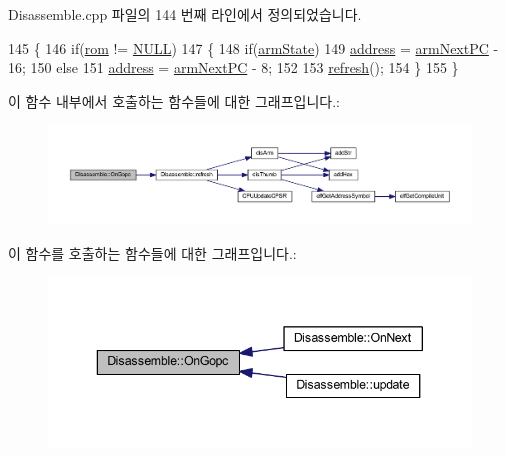 Disassemble.\+cpp 파일의 144 번째 라인에서 정의되었습니다.


\begin{DoxyCode}
145 \{
146   \textcolor{keywordflow}{if}(\mbox{\hyperlink{_globals_8cpp_adafc6ed627110c42f3893c9783f55320}{rom}} != \mbox{\hyperlink{getopt1_8c_a070d2ce7b6bb7e5c05602aa8c308d0c4}{NULL}})
147   \{
148   \textcolor{keywordflow}{if}(\mbox{\hyperlink{_g_b_a_8h_adeb5542a7f7ef80090a22d0133606250}{armState}})
149     \mbox{\hyperlink{class_disassemble_a960ac8317ada7182e59132a3ee4afb48}{address}} = \mbox{\hyperlink{arm-new_8h_a7e8bf67a6667274a53fc092b97961ca4}{armNextPC}} - 16;
150   \textcolor{keywordflow}{else}
151     \mbox{\hyperlink{class_disassemble_a960ac8317ada7182e59132a3ee4afb48}{address}} = \mbox{\hyperlink{arm-new_8h_a7e8bf67a6667274a53fc092b97961ca4}{armNextPC}} - 8;
152 
153   \mbox{\hyperlink{class_disassemble_a7cdf11d53ce0f170ad7dd8fc66961805}{refresh}}();
154   \}
155 \}
\end{DoxyCode}
이 함수 내부에서 호출하는 함수들에 대한 그래프입니다.\+:
\nopagebreak
\begin{figure}[H]
\begin{center}
\leavevmode
\includegraphics[width=350pt]{class_disassemble_ad757b7defc104599f1a20730cf7f3d63_cgraph}
\end{center}
\end{figure}
이 함수를 호출하는 함수들에 대한 그래프입니다.\+:
\nopagebreak
\begin{figure}[H]
\begin{center}
\leavevmode
\includegraphics[width=343pt]{class_disassemble_ad757b7defc104599f1a20730cf7f3d63_icgraph}
\end{center}
\end{figure}
\mbox{\label{class_disassemble_a23e74e8f32758c5b6ff63914633e2ab5}} 
